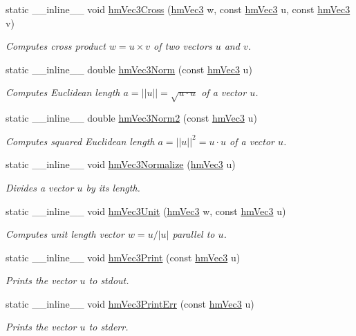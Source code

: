 \begin{DoxyCompactItemize}
static \-\_\-\-\_\-inline\-\_\-\-\_\- void \hyperlink{classhm_vec3_aa2432f88c9417292ccc76e723338d9d0}{hm\-Vec3\-Cross} (\hyperlink{classhm_vec3}{hm\-Vec3} w, const \hyperlink{classhm_vec3}{hm\-Vec3} u, const \hyperlink{classhm_vec3}{hm\-Vec3} v)
\begin{DoxyCompactList}\small\item\em Computes cross product $w = u \times v$ of two vectors $u$ and $v$. \end{DoxyCompactList}\item 
static \-\_\-\-\_\-inline\-\_\-\-\_\- double \hyperlink{classhm_vec3_aa4ea41ac84331582f4ba368b31555fe5}{hm\-Vec3\-Norm} (const \hyperlink{classhm_vec3}{hm\-Vec3} u)
\begin{DoxyCompactList}\small\item\em Computes Euclidean length $a = ||u|| = \sqrt{u \cdot u}$ of a vector $u$. \end{DoxyCompactList}\item 
static \-\_\-\-\_\-inline\-\_\-\-\_\- double \hyperlink{classhm_vec3_acb99ba855b555a5012a39bc4d58a3ad9}{hm\-Vec3\-Norm2} (const \hyperlink{classhm_vec3}{hm\-Vec3} u)
\begin{DoxyCompactList}\small\item\em Computes squared Euclidean length $a = ||u||^2 = u \cdot u$ of a vector $u$. \end{DoxyCompactList}\item 
static \-\_\-\-\_\-inline\-\_\-\-\_\- void \hyperlink{classhm_vec3_a1a468ab82b0d74a3cfbf147a398eee7f}{hm\-Vec3\-Normalize} (\hyperlink{classhm_vec3}{hm\-Vec3} u)
\begin{DoxyCompactList}\small\item\em Divides a vector $u$ by its length. \end{DoxyCompactList}\item 
static \-\_\-\-\_\-inline\-\_\-\-\_\- void \hyperlink{classhm_vec3_ae800a2d05652e47b4b28b18301267f28}{hm\-Vec3\-Unit} (\hyperlink{classhm_vec3}{hm\-Vec3} w, const \hyperlink{classhm_vec3}{hm\-Vec3} u)
\begin{DoxyCompactList}\small\item\em Computes unit length vector $w = u/|u|$ parallel to $u$. \end{DoxyCompactList}\item 
static \-\_\-\-\_\-inline\-\_\-\-\_\- void \hyperlink{classhm_vec3_afb00c0d45967c46bed0cfb4c9fa476ba}{hm\-Vec3\-Print} (const \hyperlink{classhm_vec3}{hm\-Vec3} u)
\begin{DoxyCompactList}\small\item\em Prints the vector $u$ to stdout. \end{DoxyCompactList}\item 
static \-\_\-\-\_\-inline\-\_\-\-\_\- void \hyperlink{classhm_vec3_a41ae74e4783908c95c599afbc1c889ee}{hm\-Vec3\-Print\-Err} (const \hyperlink{classhm_vec3}{hm\-Vec3} u)
\begin{DoxyCompactList}\small\item\em Prints the vector $u$ to stderr. \end{DoxyCompactList}\end{DoxyCompactItemize}


